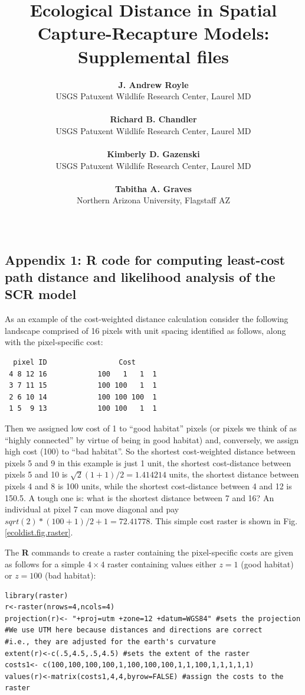 \documentclass[12pt]{article}
\title{Ecological Distance in Spatial Capture-Recapture Models: Supplemental 
files}
\author{
{\bf J. Andrew Royle}\\
USGS Patuxent Wildlife Research Center, Laurel MD \\ \\
{\bf Richard B. Chandler} \\
USGS Patuxent Wildlife Research Center, Laurel MD\\ \\
{\bf Kimberly D. Gazenski} \\
USGS Patuxent Wildlife Research Center, Laurel MD\\ \\
{\bf Tabitha A. Graves} \\
Northern Arizona University, Flagstaff AZ \\ \\
}
\begin{document}
\maketitle

\date

\newpage

\linenumbers


\begin{spacing}{1.2}



\section*{Appendix 1: {\bf R} code for computing least-cost path
  distance and likelihood analysis of the SCR model}


As an example of the cost-weighted distance calculation consider the
following landscape comprised of 16 pixels with unit spacing
identified as follows, along with the pixel-specific cost:
\begin{center}
\begin{verbatim}
  pixel ID                 Cost
 4 8 12 16            100   1   1  1
 3 7 11 15            100 100   1  1
 2 6 10 14            100 100 100  1
 1 5  9 13            100 100   1  1
\end{verbatim}
\end{center}
Then we assigned low cost of 1 to ``good habitat'' pixels (or pixels
we think of as ``highly connected'' by virtue of being in good
habitat) and, conversely, we assign high cost (100) to ``bad
habitat''. So the shortest cost-weighted distance between pixels 5 and
9 in this example is just 1 unit, the shortest cost-distance between
pixels 5 and 10 is $\sqrt{2}(1+1)/2 = 1.414214$ units, the shortest
distance between pixels 4 and 8 is 100 units, while the shortest
cost-distance between 4 and 12 is 150.5. A tough one is: what is the
shortest distance between 7 and 16? An individual at pixel 7 can move
diagonal and pay $sqrt(2)*(100+1)/2 + 1 =72.41778$.  This simple cost
raster is shown in Fig. \ref{ecoldist.fig.raster}.

The {\bf R} commands to create a raster containing the pixel-specific
costs are given as follows for a simple $4\times 4$ raster containing
values either $z=1$ (good habitat) or $z=100$ (bad habitat):
\begin{verbatim}
library(raster)
r<-raster(nrows=4,ncols=4)
projection(r)<- "+proj=utm +zone=12 +datum=WGS84" #sets the projection
#We use UTM here because distances and directions are correct
#i.e., they are adjusted for the earth's curvature
extent(r)<-c(.5,4.5,.5,4.5) #sets the extent of the raster
costs1<- c(100,100,100,100,1,100,100,100,1,1,100,1,1,1,1,1)
values(r)<-matrix(costs1,4,4,byrow=FALSE) #assign the costs to the raster
\end{verbatim}



\end{spacing}
\end{document}
